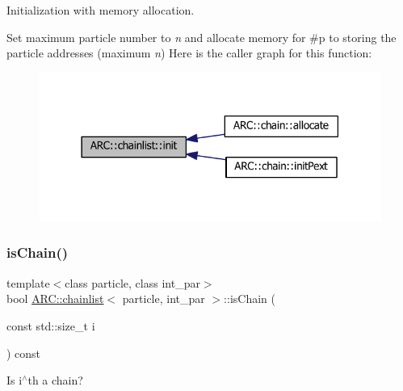 Initialization with memory allocation. 

Set maximum particle number to {\itshape n} and allocate memory for \#p to storing the particle addresses (maximum {\itshape n}) Here is the caller graph for this function\+:
\nopagebreak
\begin{figure}[H]
\begin{center}
\leavevmode
\includegraphics[width=318pt]{classARC_1_1chainlist_a82f296c7288678df8c279958304e58d8_icgraph}
\end{center}
\end{figure}
\hypertarget{classARC_1_1chainlist_af3ec0d68872c99069015fe6f5f5ba4b4}{}\label{classARC_1_1chainlist_af3ec0d68872c99069015fe6f5f5ba4b4} 
\subsubsection{\texorpdfstring{is\+Chain()}{isChain()}}
{\footnotesize\ttfamily template$<$class particle, class int\+\_\+par$>$ \\
bool \hyperlink{classARC_1_1chainlist}{A\+R\+C\+::chainlist}$<$ particle, int\+\_\+par $>$\+::is\+Chain (\begin{DoxyParamCaption}\item[{const std\+::size\+\_\+t}]{i }\end{DoxyParamCaption}) const\hspace{0.3cm}{\ttfamily [inline]}}



Is i$^\wedge$th a chain? 

